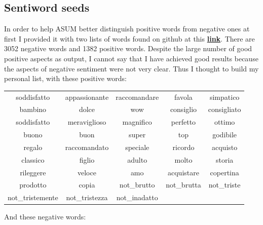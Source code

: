 \documentclass[a4paper,12pt]{article}
\begin{document}
\subsection{Sentiword seeds}
In order to help ASUM better distinguish positive words from negative ones at first I provided it with two lists of words found on github at this \href{https://github.com/gragusa/sentiment-lang-italian}{\textbf{link}}. There are 3052 negative words and 1382 positive words. Despite the large number of good positive aspects as output, I cannot say that I have achieved good results because the aspects of negative sentiment were not very clear. 
Thus I thought to build my personal list, with these positive words:\\
\begin{center}
	\begin{tabular}{ |c c c c c| } 
		\hline
		soddisfatto & appassionante & raccomandare & favola & simpatico\\ 
		bambino & dolce & wow & consiglio & consigliato\\ 
		soddisfatto & meraviglioso & magnifico & perfetto & ottimo\\ 
		buono & buon & super & top & godibile\\ 
		regalo & raccomandato & speciale & ricordo & acquisto\\ 
		classico & figlio & adulto & molto & storia\\ 
		rileggere & veloce & amo & acquistare & copertina\\ 
		prodotto & copia & not\_brutto & not\_brutta & not\_triste\\ 
		not\_tristemente & not\_tristezza & not\_inadatto & & \\ 
		\hline
	\end{tabular}
\end{center}
\newpage
\noindent And these negative words:
\end{document}
